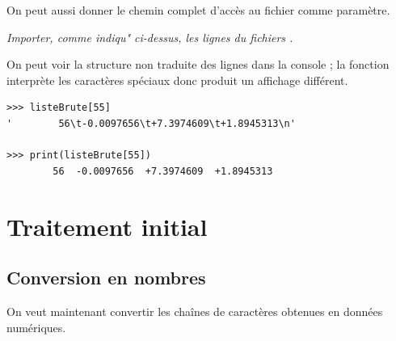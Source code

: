 On peut aussi donner le chemin complet d'accès au fichier comme paramètre.
\begin{Exercise}\it Importer, comme indiqu" ci-dessus, les lignes du fichiers .
\end{Exercise}
\begin{Answer}
\end{Answer}
On peut voir la structure non traduite des lignes dans la console ; la fonction  interprète les caractères spéciaux donc produit un affichage différent.
\begin{lstlisting}
>>> listeBrute[55]
'        56\t-0.0097656\t+7.3974609\t+1.8945313\n'

>>> print(listeBrute[55])
        56	-0.0097656	+7.3974609	+1.8945313
\end{lstlisting}
\newpage
\section{Traitement initial}
\subsection{Conversion en nombres}
On veut maintenant convertir les chaînes de caractères obtenues en données numériques.

